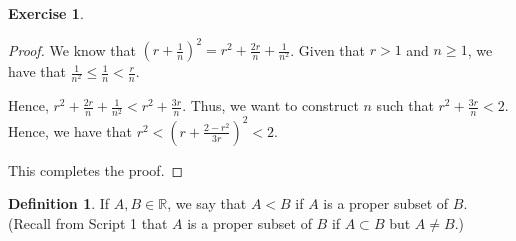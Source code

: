 \documentclass[11pt]{article}
\newcommand{\bbR}{\mathbb{R}}
\theoremstyle{definition}
\newtheorem{definition}[theorem]{Definition}
\newtheorem{exercise}[theorem]{Exercise}
\numberwithin{equation}{subsection}
\begin{document}
\begin{exercise}
\begin{enumerate}[(a)]
\begin{proof}
We know that $(r+\frac{1}{n})^2 = r^2 + \frac{2r}{n} + \frac{1}{n^2}$. Given that $r>1$ and $n \geq 1$, we have that $\frac{1}{n^2} \leq \frac{1}{n} < \frac{r}{n}$. 

Hence, $r^2 + \frac{2r}{n} + \frac{1}{n^2} < r^2 + \frac{3r}{n}$. Thus, we want to construct $n$ such that $r^2 + \frac{3r}{n} < 2$. Hence, we have that $r^2 < (r + \frac{2-r^2}{3r})^2 < 2$. 

This completes the proof.

\renewcommand\qedsymbol{QED}
\end{proof}
		
	\end{enumerate}
\end{exercise}



\begin{definition}
	If $A, B \in \bbR$, we say that $A < B$ if $A$ is a proper subset of $B$. (Recall from Script 1 that $A$ is a proper subset of $B$ if $A \subset B$ but $A \neq B$.)
\end{definition}
\end{document}
